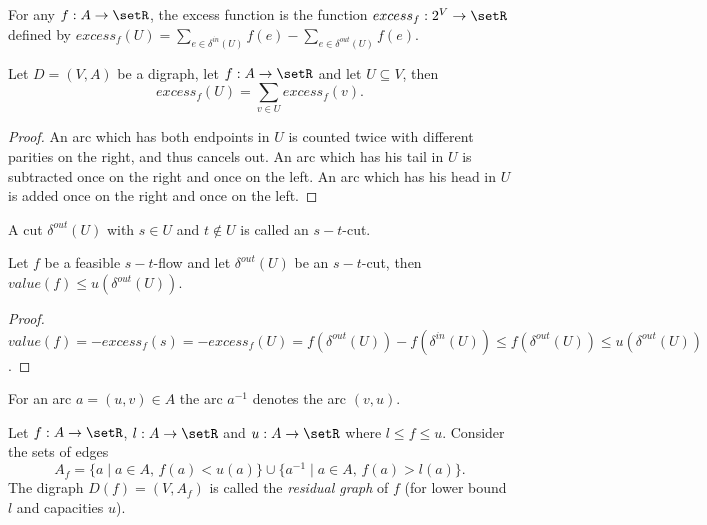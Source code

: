 \begin{definition}
  For any $f:A \to \setR$, the excess function is the function 
  $excess_f:  2^V \to \setR$  defined by $excess_f(U) = \sum_{e \in \delta^{in}(U)}
  f(e) - \sum_{e \in \delta^{out}(U)} f(e)$. 
\end{definition}


\begin{theorem}
\label{thr:6}
Let $D = (V,A)$ be a digraph, let $f:A\to\setR$ and let $U\subseteq V$, then
\begin{equation}
  \label{eq:28}
  excess_f(U) = \sum_{v \in U} excess_f(v).
\end{equation}  
\end{theorem}


\begin{proof}
  An arc which has both endpoints in $U$ is counted twice with
  different parities on the right, and thus cancels out. An arc which
  has his tail in $U$ is subtracted once on the right and once on the
  left.  An arc which has his head in $U$ is added once on the right
  and once on the left.
\end{proof}

A cut $\delta^{out}(U)$ with $s \in U$  and $t \notin U$ is called an $s-t$-cut.  

\begin{theorem}
  \label{thr:7}
  Let $f$ be a feasible $s-t$-flow and let $\delta^{out}(U)$ be an
  $s-t$-cut, then $value(f) \leq u(\delta^{out}(U))$. 
\end{theorem}

\begin{proof}
  $value(f) = -excess_f(s) = -excess_f(U) = f(\delta^{out}(U)) -
  f(\delta^{in}(U)) \leq f(\delta^{out}(U)) \leq u(\delta^{out}(U))$.
\end{proof}

For an arc $a = (u,v) \in A$ the arc $a^{-1}$ denotes the arc $(v,u)$. 

\begin{definition}
  Let $f:A \to \setR$, $l:A \to \setR$ and $u: A \to \setR$ where $l \leq f \leq u$. Consider
  the sets of edges
  \begin{equation}
    \label{eq:30}
    A_f = \{ a \mid a \in A, \, f(a) < u(a)\} \cup \{ a^{-1} \mid a \in A, \, f(a) >    l(a)\}. 
  \end{equation}
  The digraph $D(f) = (V,A_f)$ is called the \emph{residual graph} of
  $f$ (for lower bound $l$ and capacities $u$).   
\end{definition}


